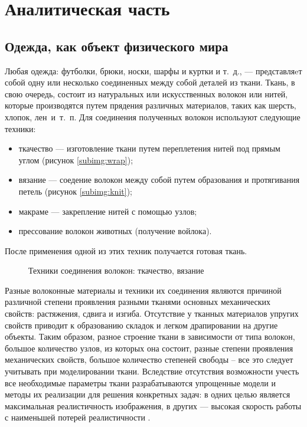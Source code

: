 \chapter{Аналитическая часть}

\section{Одежда, как объект физического мира}

Любая одежда: футболки, брюки, носки, шарфы и куртки и т.~д., --- представляeт
собой одну или несколько соединенных между собой деталей из ткани. Ткань, в свою
очередь, состоит из натуральных или искусственных волокон или нитей, которые
производятся путем прядения различных материалов, таких как шерсть, хлопок,
лен~и~т.~п. Для соединения полученных волокон используют следующие техники:
\begin{itemize}[left=\parindent]
    \item ткачество --- изготовление ткани путем переплетения нитей под прямым
        углом (рисунок \ref{subimg:wrap});
    \item вязание --- соедение волокон между собой путем образования и
        протягивания петель (рисунок \ref{subimg:knit});
    \item макраме --- закрепление нитей с помощью узлов;
    \item прессование волокон животных (получение войлока).
\end{itemize}
После применения одной из этих техник получается готовая ткань.

\begin{figure}[ht!]
    \centering
    \hspace{4ex}
    \caption{Техники соединения волокон:
              ткачество,
              вязание \cite{imgSite01}
            }
    \label{fig:getCloth}
\end{figure}

Разные волоконные материалы и техники их соединения являются причиной различной
степени проявления разными тканями основных механических свойств: растяжения,
сдвига и изгиба. Отсутствие у тканных материалов упругих свойств приводит к
образованию складок и легком драпировании на другие объекты. Таким образом,
разное строение ткани в зависимости от типа волокон, большое количество узлов,
из которых она состоит, разные степени проявления механических свойств, большое
количество степеней свободы -- все это следует учитывать при моделировании
ткани. Вследствие отсутствия возможности учесть все необходимые параметры ткани
разрабатываются упрощенные модели и методы их реализации для решения конкретных
задач: в одних целью является максимальная реалистичность изображения, в других
--- высокая скорость работы с наименьшей потерей реалистичности \cite{bib11}.


